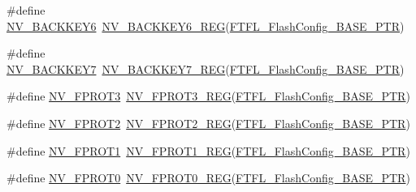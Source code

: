 \begin{DoxyCompactItemize}
\item 
\#define \hyperlink{group___n_v___register___accessor___macros_ga74544d83ca29fc4d859726eb023dadb9}{N\+V\+\_\+\+B\+A\+C\+K\+K\+E\+Y6}~\hyperlink{group___n_v___register___accessor___macros_ga9d64e9e2568804d0cf1de4cb5a1d3f1f}{N\+V\+\_\+\+B\+A\+C\+K\+K\+E\+Y6\+\_\+\+R\+EG}(\hyperlink{group___n_v___peripheral_gad199a235b90fe3e6afb977f2d6a9c565}{F\+T\+F\+L\+\_\+\+Flash\+Config\+\_\+\+B\+A\+S\+E\+\_\+\+P\+TR})
\item 
\#define \hyperlink{group___n_v___register___accessor___macros_gaf4c4eb8173a514a0fe632f29e80423d4}{N\+V\+\_\+\+B\+A\+C\+K\+K\+E\+Y7}~\hyperlink{group___n_v___register___accessor___macros_ga7f6090f0eb664b59d0e6e79b492fe8e4}{N\+V\+\_\+\+B\+A\+C\+K\+K\+E\+Y7\+\_\+\+R\+EG}(\hyperlink{group___n_v___peripheral_gad199a235b90fe3e6afb977f2d6a9c565}{F\+T\+F\+L\+\_\+\+Flash\+Config\+\_\+\+B\+A\+S\+E\+\_\+\+P\+TR})
\item 
\#define \hyperlink{group___n_v___register___accessor___macros_ga04c3d23d8164e3fb7fb4f3e011869b5a}{N\+V\+\_\+\+F\+P\+R\+O\+T3}~\hyperlink{group___n_v___register___accessor___macros_gad8e367bb2e9aae8570a3736ec8a4aee9}{N\+V\+\_\+\+F\+P\+R\+O\+T3\+\_\+\+R\+EG}(\hyperlink{group___n_v___peripheral_gad199a235b90fe3e6afb977f2d6a9c565}{F\+T\+F\+L\+\_\+\+Flash\+Config\+\_\+\+B\+A\+S\+E\+\_\+\+P\+TR})
\item 
\#define \hyperlink{group___n_v___register___accessor___macros_gaedf00f22b7dabfa124aeb38cdd5fb8a8}{N\+V\+\_\+\+F\+P\+R\+O\+T2}~\hyperlink{group___n_v___register___accessor___macros_gae06ab638a7b4ad4757c89118971127d0}{N\+V\+\_\+\+F\+P\+R\+O\+T2\+\_\+\+R\+EG}(\hyperlink{group___n_v___peripheral_gad199a235b90fe3e6afb977f2d6a9c565}{F\+T\+F\+L\+\_\+\+Flash\+Config\+\_\+\+B\+A\+S\+E\+\_\+\+P\+TR})
\item 
\#define \hyperlink{group___n_v___register___accessor___macros_ga35eb345943dea70476ecc9f1cc3db473}{N\+V\+\_\+\+F\+P\+R\+O\+T1}~\hyperlink{group___n_v___register___accessor___macros_ga1f9fafcb15ed5d1b27020f5b04edfe00}{N\+V\+\_\+\+F\+P\+R\+O\+T1\+\_\+\+R\+EG}(\hyperlink{group___n_v___peripheral_gad199a235b90fe3e6afb977f2d6a9c565}{F\+T\+F\+L\+\_\+\+Flash\+Config\+\_\+\+B\+A\+S\+E\+\_\+\+P\+TR})
\item 
\#define \hyperlink{group___n_v___register___accessor___macros_gabd1755172d62e3c49cb9e79d2065a147}{N\+V\+\_\+\+F\+P\+R\+O\+T0}~\hyperlink{group___n_v___register___accessor___macros_ga04dc6fb630cffc56b5fff1847704cc53}{N\+V\+\_\+\+F\+P\+R\+O\+T0\+\_\+\+R\+EG}(\hyperlink{group___n_v___peripheral_gad199a235b90fe3e6afb977f2d6a9c565}{F\+T\+F\+L\+\_\+\+Flash\+Config\+\_\+\+B\+A\+S\+E\+\_\+\+P\+TR})

\end{DoxyCompactItemize}
